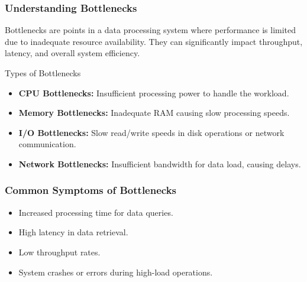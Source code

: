 \documentclass[aspectratio=169]{beamer}
\begin{document}
\begin{frame}[fragile]
    \frametitle{Understanding Bottlenecks}
    Bottlenecks are points in a data processing system where performance is limited due to inadequate resource availability. They can significantly impact throughput, latency, and overall system efficiency.

    \begin{block}{Types of Bottlenecks}
        \begin{itemize}
            \item \textbf{CPU Bottlenecks:} Insufficient processing power to handle the workload.
            \item \textbf{Memory Bottlenecks:} Inadequate RAM causing slow processing speeds.
            \item \textbf{I/O Bottlenecks:} Slow read/write speeds in disk operations or network communication.
            \item \textbf{Network Bottlenecks:} Insufficient bandwidth for data load, causing delays.
        \end{itemize}
    \end{block}
\end{frame}

\begin{frame}[fragile]
    \frametitle{Common Symptoms of Bottlenecks}
    \begin{itemize}
        \item Increased processing time for data queries.
        \item High latency in data retrieval.
        \item Low throughput rates.
        \item System crashes or errors during high-load operations.
    \end{itemize}
\end{frame}
\end{document}

